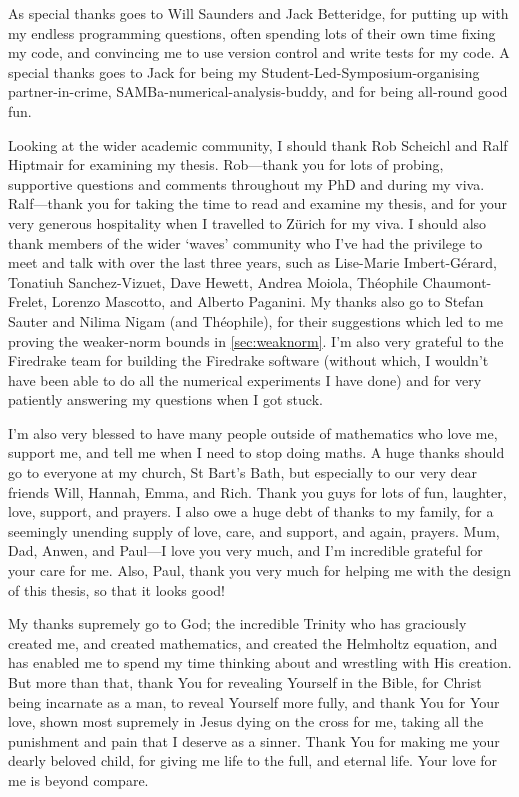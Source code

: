 {  As special thanks goes to Will Saunders and Jack Betteridge, for putting up with my endless programming questions, often spending lots of their own time fixing my code, and convincing me to use version control and write tests for my code. A special thanks goes to Jack for being my Student-Led-Symposium-organising partner-in-crime, SAMBa-numerical-analysis-buddy, and for being all-round good fun.

  Looking at the wider academic community, I should thank Rob Scheichl and Ralf Hiptmair for examining my thesis. Rob---thank you for lots of probing, supportive questions and comments throughout my PhD and during my viva. Ralf---thank you for taking the time to read and examine my thesis, and for your very generous hospitality when I travelled to Z\"urich for my viva. I should also thank members of the wider `waves' community who I've had the privilege to meet and talk with over the last three years, such as Lise-Marie Imbert-G\'erard, Tonatiuh Sanchez-Vizuet, Dave Hewett, Andrea Moiola, Th\'eophile Chaumont-Frelet, Lorenzo Mascotto, and Alberto Paganini. My thanks also go to Stefan Sauter and Nilima Nigam (and Th\'eophile), for their suggestions which led to me proving the weaker-norm bounds in \cref{sec:weaknorm}. I'm also very grateful to the Firedrake team for building the Firedrake software (without which, I wouldn't have been able to do all the numerical experiments I have done) and for very patiently answering my questions when I got stuck.

I'm also very blessed to have many people outside of mathematics who love me, support me, and tell me when I need to stop doing maths. A huge thanks should go to everyone at my church, St Bart's Bath, but especially to our very dear friends Will, Hannah, Emma, and Rich. Thank you guys for lots of fun, laughter, love, support, and prayers. I also owe a huge debt of thanks to my family, for a seemingly unending supply of love, care, and support, and again, prayers. Mum, Dad, Anwen, and Paul---I love you very much, and I'm incredible grateful for your care for me. Also, Paul, thank you very much for helping me with the design of this thesis, so that it looks good!

My thanks supremely go to God; the incredible Trinity who has graciously created me, and created mathematics, and created the Helmholtz equation, and has enabled me to spend my time thinking about and wrestling with His creation. But more than that, thank You for revealing Yourself in the Bible, for Christ being incarnate as a man, to reveal Yourself more fully, and thank You for Your love, shown most supremely in Jesus  dying on the cross for me, taking all the punishment and pain that I deserve as a sinner. Thank You for making me your dearly beloved child, for giving me life to the full, and eternal life. Your love for me is beyond compare.

}
